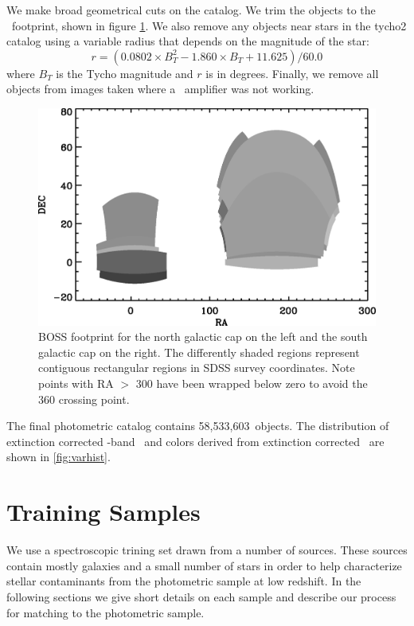 \documentclass[preprint]{aastex}
\newcommand{\nphoto}{58,533,603}
\begin{document}
We make broad geometrical cuts on the catalog.  We trim the objects to the
\boss\ footprint, shown in figure \ref{fig:footprint}. We also remove any
objects near stars in the tycho2 catalog \citep{tycho2} using a variable radius
that depends on the magnitude of the star:
\begin{equation}
r = (0.0802\times B_T^2 - 1.860\times B_T + 11.625)/60.0
\end{equation}
where $B_T$ is the Tycho magnitude and $r$ is in degrees.  Finally, we remove
all objects from images taken where a \umag\ amplifier was not working.

\begin{figure}[t] \centering
 \centering 
 \includegraphics[scale=0.75]{figures/boss-poly-coverage.eps}
 \caption{BOSS footprint for the north galactic cap on the left
 and the south galactic cap on the right.  The differently shaded
 regions represent contiguous rectangular regions in SDSS survey coordinates.
 Note points with RA $>$ 300 have been wrapped below zero 
 to avoid the 360 crossing point.}
 \label{fig:footprint}
\end{figure}

The final photometric catalog contains \nphoto\ objects.  The distribution of
extinction corrected \rmag-band \cmodelmag\ and colors derived from extinction
corrected \modelmag\ are shown in \ref{fig:varhist}.

\section{Training Samples} \label{sec:train}

We use a spectroscopic trining set drawn from a number of sources. These
sources contain mostly galaxies and a small number of stars in order to help
characterize stellar contaminants from the photometric sample at low redshift.
In the following sections we give short details on each sample and describe our
process for matching to the photometric sample.
\end{document}
